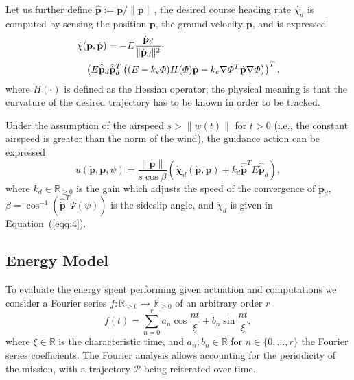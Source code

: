 \documentclass[letterpaper,10pt,conference]{ieeeconf}
\begin{document}
Let us further define $\hat{\mathbf{p}}:=\mathbf{p}/\|\mathbf{p}\|$, the desired course heading rate $\dot{\chi_d}$ is computed by sensing the position $\mathbf{p}$, the ground velocity $\dot{\mathbf{p}}$, and is expressed
\begin{equation}\label{eqq:4}\begin{split}
  &\dot{\chi}(\mathbf{p},\dot{\mathbf{p}})=-E\frac{\dot{\mathbf{p}}_d}{\|\dot{\mathbf{p}}_d\|^2}\cdot\\
  &\hspace{2ex}\left( E\hat{\dot{\mathbf{p}}}_d\hat{\dot{\mathbf{p}}}_d^T\left( (E-k_e\varPhi)H(\varPhi)\dot{\mathbf{p}}-k_e\nabla\varPhi^T\dot{\mathbf{p}}\nabla\varPhi \right) \right)^T,
\end{split}
\end{equation} 
where $H(\cdot)$ is defined as the Hessian operator; the physical meaning is that the curvature of the desired trajectory has to be known in order to be tracked.

Under the assumption of the airspeed $s>\|w(t)\|$ for $t>0$ (i.e., the constant airspeed is greater than the norm of the wind), the guidance action can be expressed
\begin{equation}\label{eqq:5}
  u(\dot{\mathbf{p}},\mathbf{p},\psi)=\frac{\|\mathbf{p}\|}{s\cos{\beta}}\left( \dot{\mathbf{\chi}}_d(\dot{\mathbf{p}},\mathbf{p})+k_d\hat{\dot{\mathbf{p}}}^TE\hat{\dot{\mathbf{p}}}_d \right),
\end{equation} 
where $k_d\in\mathbb{R}_{\geq 0}$ is the gain which adjusts the speed of the convergence of $\dot{\mathbf{p}}_d$, $\beta=\cos^{-1}{\left( \hat{\dot{\mathbf{p}}}^T\Psi(\psi) \right)}$ is the sideslip angle, and $\dot{\chi}_d$ is given in Equation~(\ref{eqq:4}).

\subsection{Energy Model}

To evaluate the energy spent performing given actuation and computations we consider a Fourier series $f:\mathbb{R}_{\geq 0}\rightarrow\mathbb{R}_{\geq 0}$ of an arbitrary order $r$
\begin{equation}\label{eqq:6}
  f(t)=\sum_{n=0}^{r}{a_n\cos{\frac{nt}{\xi}}+b_n\sin{\frac{nt}{\xi}}},
\end{equation}
where $\xi\in\mathbb{R}$ is the characteristic time, and $a_n, b_n\in\mathbb{R}$ for $n\in\{0,\dotsc,r\}$ the Fourier series coefficients. The Fourier analysis allows accounting for the periodicity of the mission, with a trajectory $\mathcal{P}$ being reiterated over time. 
\end{document}
